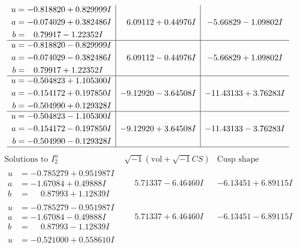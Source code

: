 \documentclass[1p]{elsarticle_modified}
\theoremstyle{definition}
\newcommand{\I}{\sqrt{-1}}
\begin{document}
$$\begin{array}{c|c|c}
\begin{aligned}
u &= -0.818820 + 0.829999 I \\
a &= -0.074029 + 0.382486 I \\
b &= \phantom{-}0.79917 - 1.22352 I\end{aligned}
 & \phantom{-}6.09112 + 0.44976 I & -5.66829 - 1.09802 I \\ \hline\begin{aligned}
u &= -0.818820 - 0.829999 I \\
a &= -0.074029 - 0.382486 I \\
b &= \phantom{-}0.79917 + 1.22352 I\end{aligned}
 & \phantom{-}6.09112 - 0.44976 I & -5.66829 + 1.09802 I \\ \hline\begin{aligned}
u &= -0.504823 + 1.105300 I \\
a &= -0.154172 + 0.197850 I \\
b &= -0.504990 + 0.129328 I\end{aligned}
 & -9.12920 - 3.64508 I & -11.43133 + 3.76283 I \\ \hline\begin{aligned}
u &= -0.504823 - 1.105300 I \\
a &= -0.154172 - 0.197850 I \\
b &= -0.504990 - 0.129328 I\end{aligned}
 & -9.12920 + 3.64508 I & -11.43133 - 3.76283 I\\
 \hline 
 \end{array}$$\newpage$$\begin{array}{c|c|c}  
\text{Solutions to }I^u_{2}& \I (\text{vol} + \sqrt{-1}CS) & \text{Cusp shape}\\
 \hline 
\begin{aligned}
u &= -0.785279 + 0.951987 I \\
a &= -1.67084 + 0.49888 I \\
b &= \phantom{-}0.87993 + 1.12839 I\end{aligned}
 & \phantom{-}5.71337 - 6.46460 I & -6.13451 + 6.89115 I \\ \hline\begin{aligned}
u &= -0.785279 - 0.951987 I \\
a &= -1.67084 - 0.49888 I \\
b &= \phantom{-}0.87993 - 1.12839 I\end{aligned}
 & \phantom{-}5.71337 + 6.46460 I & -6.13451 - 6.89115 I \\ \hline\begin{aligned}
u &= -0.521000 + 0.558610 I \\

\end{aligned}
\end{array}$$
\end{document}

